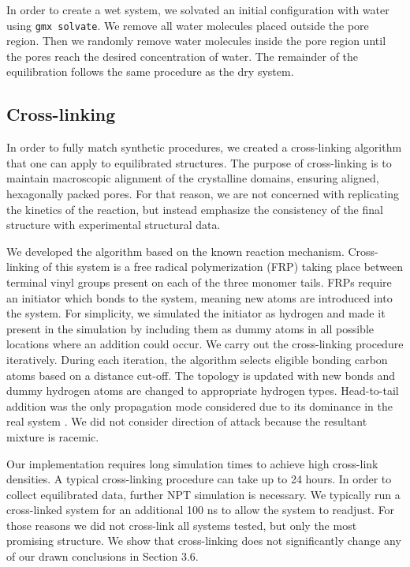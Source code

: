 \documentclass[journal=jpcbfk,manusciprt=article]{achemso}
\begin{document}
  In order to create a wet system, we solvated an initial configuration with
  water using \texttt{gmx solvate}. We remove all water molecules placed outside
  the pore region. Then we randomly remove water molecules inside the pore region
  until the pores reach the desired concentration of water. The remainder of the
  equilibration follows the same procedure as the dry system. 

  \subsection{Cross-linking}
  
  In order to fully match synthetic procedures, we created a cross-linking
  algorithm that one can apply to equilibrated structures. The purpose of
  cross-linking is to maintain macroscopic alignment of the crystalline domains,
  ensuring aligned, hexagonally packed pores. For that reason, we are not
  concerned with replicating the kinetics of the reaction, but instead emphasize
  the consistency of the final structure with experimental structural data. 

  We developed the algorithm based on the known reaction mechanism.
  Cross-linking of this system is a free radical polymerization (FRP) taking
  place between terminal vinyl groups present on each of the three monomer tails.
  FRPs require an initiator which bonds to the system, meaning new atoms are
  introduced into the system. For simplicity, we simulated the initiator as
  hydrogen and made it present in the simulation by including them as dummy atoms
  in all possible locations where an addition could occur. We carry out the
  cross-linking procedure iteratively. During each iteration, the algorithm
  selects eligible bonding carbon atoms based on a distance cut-off. The topology
  is updated with new bonds and dummy hydrogen atoms are changed to appropriate
  hydrogen types.  Head-to-tail addition was the only propagation mode considered
  due to its dominance in the real system \cite{young_introduction_2011}. We did
  not consider direction of attack because the resultant mixture is racemic.

  Our implementation requires long simulation times to achieve high cross-link 
  densities. A typical cross-linking procedure can take up to 24 hours. In
  order to collect equilibrated data, further NPT simulation is necessary. We
  typically run a cross-linked system for an additional 100 ns to allow the system
  to readjust. For those reasons we did not cross-link all systems tested, but only
  the most promising structure. We show that cross-linking does not significantly
  change any of our drawn conclusions in Section 3.6.
\end{document}
